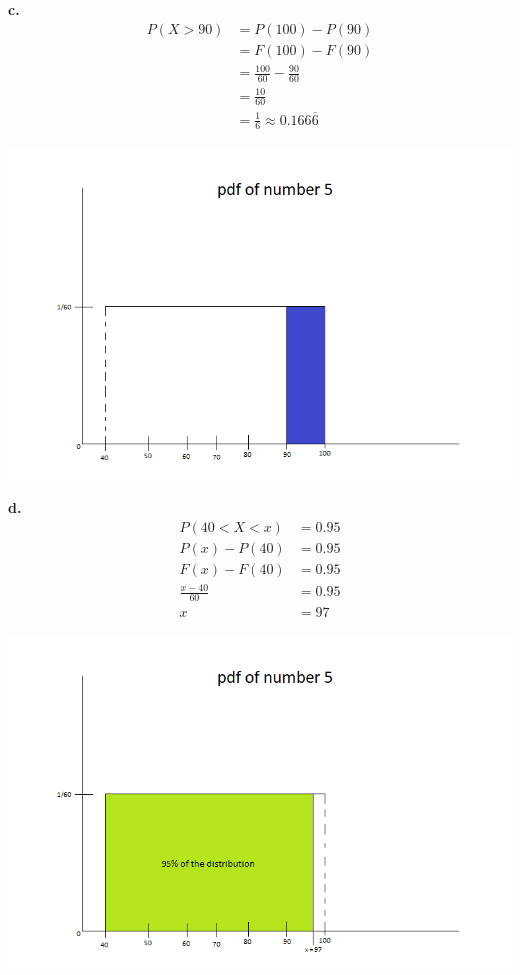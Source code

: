 \documentclass[12pt]{report}
\begin{document}
\noindent \textbf{c.} 
\begin{align*}
P(X > 90) &= P(100) - P(90)\\
&= F(100) - F(90)\\
&= \frac{100}{60} - \frac{90}{60}\\
&= \frac{10}{60} \\
&= \boxed{\frac{1}{6} \approx 0.166\overline{6}}
\end{align*}

\includegraphics[scale = .7]{hw3_5c}

\pagebreak
\noindent \textbf{d.} 
\begin{align*}
P(40 < X < x) &= 0.95\\
P(x) - P(40) &= 0.95\\
F(x) - F(40) &= 0.95\\
\frac{x-40}{60} &= 0.95\\
x &= \boxed{97}
\end{align*}

\includegraphics[scale = 0.7]{hw3_5d}\\
\end{document}
